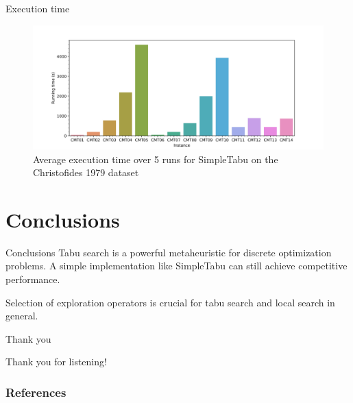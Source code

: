 \documentclass[9pt]{beamer}
\begin{document}
\begin{frame}{Execution time}
\begin{figure}
    \centering
    \includegraphics[width=\textwidth]{images/runtime_cmt.jpg}
    \caption{Average execution time over 5 runs for SimpleTabu on the Christofides 1979 dataset}
\end{figure}
\end{frame}

\section{Conclusions}
\begin{frame}{Conclusions}
Tabu search is a powerful metaheuristic for discrete optimization problems.
A simple implementation like SimpleTabu can still achieve competitive performance.

Selection of exploration operators is crucial for tabu search and local search in general.
\end{frame}

\begin{frame}{Thank you}
    \begin{center}
        \Huge{Thank you for listening!}
    \end{center}
\end{frame}

\begin{frame}[allowframebreaks]
    \frametitle{References}
    
    
\end{frame}
\end{document}
